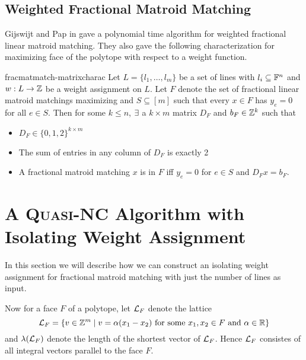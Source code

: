 \subsection{Weighted Fractional Matroid Matching}
Gijswijt and Pap in \cite{GijswijtPap_2013_Aaf} gave a polynomial time algorithm for weighted fractional linear matroid matching. They also gave the following characterization for maximizing face of the polytope with respect to a weight function.
\begin{Theorem}{\cite[Prood of Theorem 1]{GijswijtPap_2013_Aaf}}{fracmatmatch-matrixcharac}
	Let $L=\{l_1,\dots, l_m\}$ be a set of lines with $l_i\subseteq \mathbb{F}^n$ and $w:L\to \mathbb{Z}$ be a weight assignment on $L$. Let $F$ denote the set of fractional linear matroid matchings maximizing and $S\subseteq [m]$ such that every $x\in F$ has $y_e=0$ for all $e\in S$. Then for some $k\leq n$, $\exists$ a $k\times m$ matrix $D_F$ and $b_F\in \mathbb{Z}^k$ such that \begin{itemize}
		\item $D_F\in\{0,1,2\}^{k\times m}$
		\item The sum of entries in any column of $D_F$ is exactly 2
		\item A fractional matroid matching $x$ is in $F$ iff $y_e=0$ for $e\in S$ and $D_Fx=b_F$.
	\end{itemize}
\end{Theorem}
\section{A \textsc{Quasi-NC} Algorithm with Isolating Weight Assignment}
In this section we will describe how we can construct an isolating weight assignment for fractional matroid matching with just the number of lines as input.

Now for a face $F$ of a polytope, let $\mathcal{L}_F$ denote the lattice $$\mathcal{L}_F=\{v\in\mathbb{Z}^{m}\mid v=\alpha(x_1-x_2)\text{  for some $x_1,x_2\in F$ and $\alpha\in\mathbb{R}$}\}$$and $\lambda(\mathcal{L}_F)$ denote the length of the shortest vector of $\mathcal{L}_F$. Hence $\mathcal{L}_F$ consistes of all integral vectors parallel to the face $F$.

